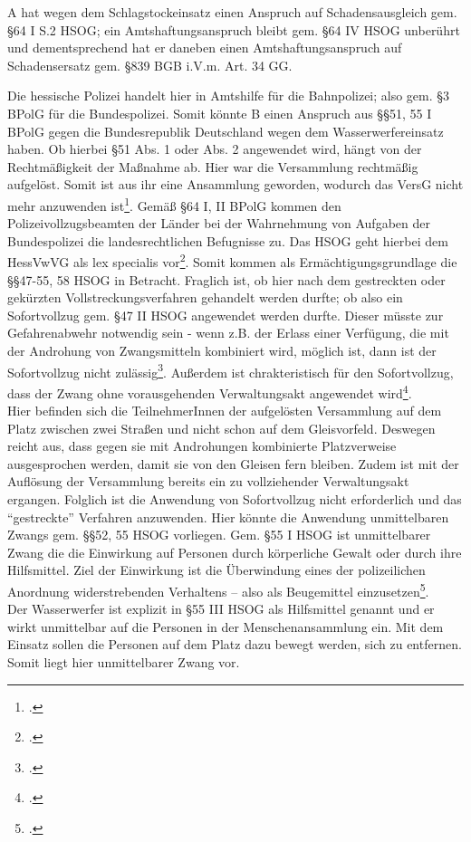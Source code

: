 \documentclass[widefront, ngerman]{jura}
\begin{document}
\levelup{}
A hat wegen dem Schlagstockeinsatz einen Anspruch auf Schadensausgleich gem. §64 I S.2 HSOG; ein Amtshaftungsanspruch bleibt gem. §64 IV HSOG unberührt und dementsprechend hat er daneben einen Amtshaftungsanspruch auf Schadensersatz gem. §839 BGB i.V.m. Art. 34 GG.


\levelup {}
Die hessische Polizei handelt hier in Amtshilfe für die Bahnpolizei; also gem. §3 BPolG für die Bundespolizei. Somit könnte B einen Anspruch aus §§51, 55 I BPolG gegen die Bundesrepublik Deutschland wegen dem Wasserwerfereinsatz haben. Ob hierbei §51 Abs. 1 oder Abs. 2 angewendet wird, hängt von der Rechtmäßigkeit der Maßnahme ab.
Hier war die Versammlung rechtmäßig aufgelöst. Somit ist aus ihr eine Ansammlung geworden, wodurch das VersG nicht mehr anzuwenden ist\footcite[§21 Rn 3]{PierothSchlinkPolizei}. 
Gemäß §64 I, II BPolG kommen den Polizeivollzugsbeamten der Länder bei der Wahrnehmung von Aufgaben der Bundespolizei die landesrechtlichen Befugnisse zu. Das HSOG geht hierbei dem HessVwVG als lex specialis vor\footcite[Rn 1008]{detterbeckVerwR}. Somit kommen als Ermächtigungsgrundlage die §§47-55, 58 HSOG in Betracht.
Fraglich ist, ob hier nach dem gestreckten oder gekürzten Vollstreckungsverfahren gehandelt werden durfte; ob also ein Sofortvollzug gem. §47 II HSOG angewendet werden durfte. Dieser müsste zur Gefahrenabwehr notwendig sein - wenn z.B. der Erlass einer Verfügung, die mit der Androhung von Zwangsmitteln kombiniert wird, möglich ist, dann ist der Sofortvollzug nicht zulässig\footcite[Rn 281]{MuehlLeggereitHausmann}. Außerdem ist chrakteristisch für den Sofortvollzug, dass der Zwang ohne vorausgehenden Verwaltungsakt angewendet wird\footcite[§24 Rn 38]{PierothSchlinkPolizei}.\\
Hier befinden sich die TeilnehmerInnen der aufgelösten Versammlung auf dem Platz zwischen zwei Straßen und nicht schon auf dem Gleisvorfeld. Deswegen reicht aus, dass gegen sie mit Androhungen kombinierte Platzverweise ausgesprochen werden, damit sie von den Gleisen fern bleiben. Zudem ist mit der Auflösung der Versammlung bereits ein zu vollziehender Verwaltungsakt ergangen. Folglich ist die Anwendung von Sofortvollzug nicht erforderlich und das "`gestreckte"' Verfahren anzuwenden.
Hier könnte die Anwendung unmittelbaren Zwangs gem. §§52, 55 HSOG vorliegen. Gem. §55 I HSOG ist unmittelbarer Zwang die die Einwirkung auf Personen durch körperliche Gewalt oder durch ihre Hilfsmittel. Ziel der Einwirkung ist die Überwindung eines der polizeilichen Anordnung widerstrebenden Verhaltens -- also als Beugemittel einzusetzen\footcite[§52 Rn 1, §55 Rn 4]{HornmannHSOG}.\\
Der Wasserwerfer ist explizit in §55 III HSOG als Hilfsmittel genannt und er wirkt unmittelbar auf die Personen in der Menschenansammlung ein. Mit dem Einsatz sollen die Personen auf dem Platz dazu bewegt werden, sich zu entfernen. Somit liegt hier unmittelbarer Zwang vor.
\end{document}
